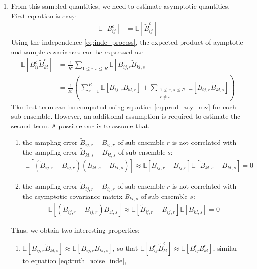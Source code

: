 \documentclass[12pt]{scrartcl}
\begin{document}
\begin{enumerate}
\item From this sampled quantities, we need to estimate asymptotic quantities. First equation is easy:
\begin{align}
\mathbb{E} \left[B^c_{ij}\right] & = \mathbb{E} \left[\widetilde{B}^c_{ij}\right]
\end{align}
Using the independence \eqref{eq:inde_process}, the expected product of aymptotic and sample covariances can be expressed as:
\begin{align}
\mathbb{E} \left[B^c_{ij} \widetilde{B}^c_{kl} \right] & = \frac{1}{R^2} \sum_{1 \le r,s \le R} \mathbb{E} \left[B_{ij,r} \widetilde{B}_{kl,s}\right] \nonumber \\
& = \frac{1}{R^2} \left(\sum_{r=1}^R \mathbb{E} \left[B_{ij,r} B_{kl,r}\right] + \sum_{\substack{1 \le r,s \le R\\r \ne s}} \mathbb{E} \left[B_{ij,r} \widetilde{B}_{kl,s}\right]\right)
\end{align}
The first term can be computed using equation \eqref{eq:prod_asy_cov} for each sub-ensemble. However, an additional assumption is required to estimate the second term. A possible one is to assume that:
\begin{enumerate}
\item the sampling error $\widetilde{B}_{ij,r} - B_{ij,r}$ of sub-ensemble $r$ is not correlated with the sampling error $\widetilde{B}_{kl,s} - B_{kl,s}$ of sub-ensemble $s$:
\begin{align}
\mathbb{E} \left[\left(\widetilde{B}_{ij,r} - B_{ij,r}\right)\left(\widetilde{B}_{kl,s} - B_{kl,s}\right)\right] \approx \mathbb{E} \left[\widetilde{B}_{ij,r} - B_{ij,r}\right] \mathbb{E} \left[\widetilde{B}_{kl,s} - B_{kl,s}\right] = 0
\end{align}
\item the sampling error $\widetilde{B}_{ij,r} - B_{ij,r}$ of sub-ensemble $r$ is not correlated with the asymptotic covariance matrix $B_{kl,s}$ of sub-ensemble $s$:
\begin{align}
\mathbb{E} \left[\left(\widetilde{B}_{ij,r} - B_{ij,r}\right)B_{kl,s}\right] \approx \mathbb{E} \left[\widetilde{B}_{ij,r} - B_{ij,r}\right] \mathbb{E} \left[B_{kl,s}\right] = 0
\end{align}
\end{enumerate}
Thus, we obtain two interesting properties:
\begin{enumerate}
\item $\mathbb{E} \left[B_{ij,r} \widetilde{B}_{kl,s}\right] \approx \mathbb{E} \left[B_{ij,r} B_{kl,s}\right]$, so that $\mathbb{E} \left[B^c_{ij} \widetilde{B}^c_{kl} \right] \approx \mathbb{E} \left[B^c_{ij} B^c_{kl} \right]$, similar to equation \eqref{eq:truth_noise_inde},

\end{enumerate}
\end{enumerate}
\end{document}
